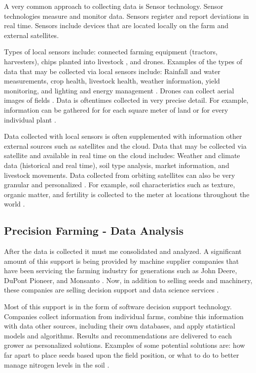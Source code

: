 \documentclass[sigconf]{acmart}
\begin{document}
A very common approach to collecting data is Sensor technology.  Sensor technologies measure and monitor data. Sensors register and report deviations in real time.  Sensors include devices that are located locally on the farm and external satellites. 

Types of local sensors include: connected farming equipment (tractors, harvesters), chips planted into livestock \cite{DevEcon}, and drones.  Examples of the types of data that may be collected via local sensors include: Rainfall and water measurements, crop health, livestock health, weather information, yield monitoring, and lighting and energy management \cite{Wolfert}.  Drones can collect aerial images of fields \cite{www-google-Wikipedia}. Data is oftentimes collected in very precise detail.  For example, information can be gathered for for each square meter of land or for every individual plant \cite{www-google-Digital}. 

Data collected with local sensors is often supplemented with information other external sources such as satellites and the cloud.  Data that may be collected via satellite and available in real time on the cloud includes: Weather and climate data (historical and real time), soil type analysis, market information, and livestock movements.  Data collected from orbiting satellites can also be very granular and personalized \cite{DevEcon}. For example, soil characteristics such as texture, organic matter, and fertility is collected to the meter at locations throughout the world \cite{DevEcon}. 

\subsection{Precision Farming - Data Analysis}

After the data is collected it must me consolidated and analyzed.  A significant amount of this support is being provided by machine supplier companies that have been servicing the farming industry for generations such as John Deere, DuPont Pioneer, and Monsanto \cite{www-google-Crop}.  Now, in addition to selling seeds and machinery, these companies are selling decision support and data science services \cite{www-google-Farm}.

Most of this support is in the form of software decision support technology.  Companies collect information from individual farms, combine this information with data other sources, including their own databases, and apply statistical  models and algorithms.  Results and recommendations are delivered to each grower as personalized solutions.  Examples of some potential solutions are: how far apart to place seeds based upon the field position, or what to do to better manage nitrogen levels in the soil \cite{www-google-Crop}. 
\end{document}
